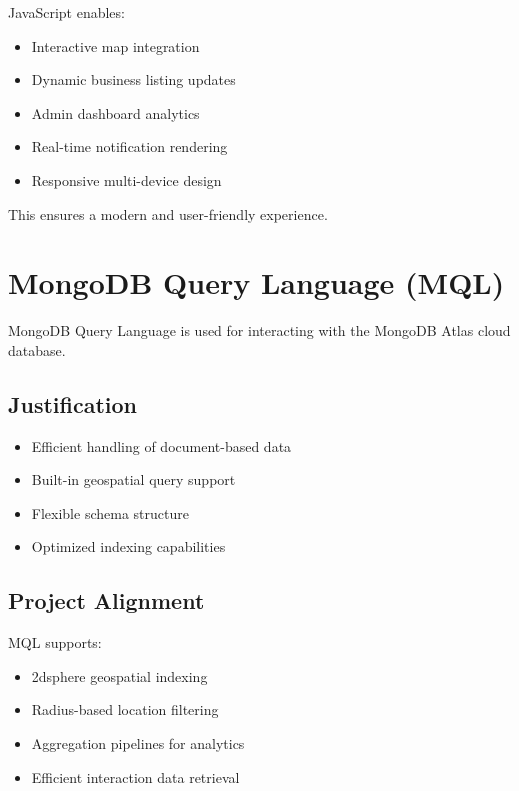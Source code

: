 \documentclass[12pt,a4paper]{report}
\begin{document}
JavaScript enables:

\begin{itemize}

\item Interactive map integration

\item Dynamic business listing updates

\item Admin dashboard analytics

\item Real-time notification rendering

\item Responsive multi-device design

\end{itemize}

This ensures a modern and user-friendly experience.

\section{MongoDB Query Language (MQL)}

MongoDB Query Language is used for interacting with the MongoDB Atlas cloud database.

\subsection*{Justification}

\begin{itemize}

\item Efficient handling of document-based data

\item Built-in geospatial query support

\item Flexible schema structure

\item Optimized indexing capabilities

\end{itemize}

\subsection*{Project Alignment}

MQL supports:

\begin{itemize}

\item 2dsphere geospatial indexing

\item Radius-based location filtering

\item Aggregation pipelines for analytics

\item Efficient interaction data retrieval

\end{itemize}
\end{document}
